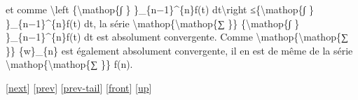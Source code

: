 \documentclass[]{article}
\begin{document}
et comme \textbackslash{}left \textbar{}\{\textbackslash{}mathop\{∫ \}
\}\_\{n−1\}\^{}\{n\}f(t) dt\textbackslash{}right
\textbar{}≤\{\textbackslash{}mathop\{∫ \}
\}\_\{n−1\}\^{}\{n\}\textbar{}f(t)\textbar{} dt, la série
\textbackslash{}mathop\{\textbackslash{}mathop\{∑ \}\}
\{\textbackslash{}mathop\{∫ \} \}\_\{n−1\}\^{}\{n\}f(t) dt est
absolument convergente. Comme
\textbackslash{}mathop\{\textbackslash{}mathop\{∑ \}\} \{w\}\_\{n\} est
également absolument convergente, il en est de même de la série
\textbackslash{}mathop\{\textbackslash{}mathop\{∑ \}\} f(n).

{[}\href{coursse39.html}{next}{]} {[}\href{coursse37.html}{prev}{]}
{[}\href{coursse37.html\#tailcoursse37.html}{prev-tail}{]}
{[}\href{coursse38.html}{front}{]}
{[}\href{coursch8.html\#coursse38.html}{up}{]}
\end{document}
